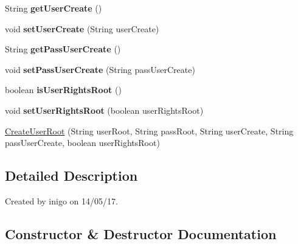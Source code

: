 \begin{DoxyCompactItemize}
\mbox{\label{class_create_user_root_a3bf1bdb585e44c54f6bb40dd08bd54bf}} 
String {\bfseries get\+User\+Create} ()
\item 
\mbox{\label{class_create_user_root_a288697775d0b4d8e61d15e587d007c6c}} 
void {\bfseries set\+User\+Create} (String user\+Create)
\item 
\mbox{\label{class_create_user_root_a2706b425eeb1642e2b3e3dce74909e1a}} 
String {\bfseries get\+Pass\+User\+Create} ()
\item 
\mbox{\label{class_create_user_root_a1fa56655ebc5cfce86df78429d22a22b}} 
void {\bfseries set\+Pass\+User\+Create} (String pass\+User\+Create)
\item 
\mbox{\label{class_create_user_root_a46105498a89702d50c7ee93b000878cc}} 
boolean {\bfseries is\+User\+Rights\+Root} ()
\item 
\mbox{\label{class_create_user_root_a20fbe3d3cda3ea5bcbc238e4baab039d}} 
void {\bfseries set\+User\+Rights\+Root} (boolean user\+Rights\+Root)
\item 
\hyperlink{class_create_user_root_a089337f6faedcd6f4850ac9bf60c7d85}{Create\+User\+Root} (String user\+Root, String pass\+Root, String user\+Create, String pass\+User\+Create, boolean user\+Rights\+Root)
\end{DoxyCompactItemize}


\subsection{Detailed Description}
Created by inigo on 14/05/17. 

\subsection{Constructor \& Destructor Documentation}
\mbox{\label{class_create_user_root_a089337f6faedcd6f4850ac9bf60c7d85}} 
